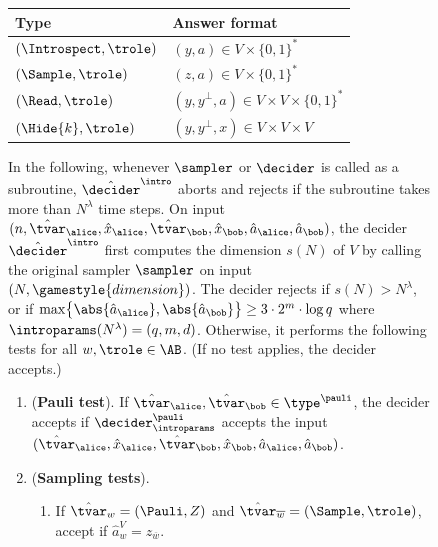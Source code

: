 \begin{figure}[!htbp]
  \begin{gamespec}
    \begin{table}[H]
      \centering
      \small
      \begin{tabularx}{.7\textwidth}{l X}
        \toprule
        Type \hspace{6em} & Answer format\\
        \midrule
        $(\Introspect, \trole)$ & $(y,a) \in V \times \{0,1\}^*$ \\
        $(\Sample, \trole)$ &  $(z,a) \in V \times \{0,1\}^*$ \\
        $(\Read, \trole)$ & $(y,y^{\perp},a) \in V \times V \times \{0,1\}^*$\\
        $(\Hide{k}, \trole)$ & $(y,y^{\perp},x) \in V \times V \times V$\\
        \bottomrule
      \end{tabularx}
    \end{table}
    In the following, whenever $\sampler$ or $\decider$ is called as a subroutine,
    $\tdint$ aborts and rejects if the subroutine takes more than
    $N^\lambda$ time steps.
    On input $(n, \hat{\tvar}_\alice, \hat{x}_\alice, \hat{\tvar}_\bob,
    \hat{x}_\bob, \hat{a}_\alice, \hat{a}_\bob)$, the decider $\tdint$
    first computes the dimension $s(N)$ of $V$ by calling the original sampler
    $\sampler$ on input $(N,\gamestyle{dimension})$.
    The decider rejects if $s(N) > N^\lambda$, or if  $\max \bigl\{ \abs{\hat{a}_\alice},
    \abs{\hat{a}_\bob} \bigr\} \geq 3 \cdot 2^m \cdot \log q$ where $\introparams(N^\lambda) = (q,m,d)$. Otherwise, it performs the following tests for all $w,\trole \in \AB$.
    (If no test applies, the decider accepts.) 
    

\begin{enumerate}[itemsep=2pt, parsep=2pt]
    \item (\textbf{Pauli test}).
      \label{enu:pauli}
      If $\hat{\tvar}_\alice, \hat{\tvar}_\bob \in \type^\pauli$, the decider
      accepts if $\decider^\pauli_\introparams$ accepts the input
      $(\hat{\tvar}_\alice, \hat{x}_\alice, \hat{\tvar}_\bob, \hat{x}_\bob,
      \hat{a}_\alice, \hat{a}_\bob)$.
    \item (\textbf{Sampling tests}).
      \label{enu:sampling}
      \begin{enumerate}
      \item If $\hat{\tvar}_w = (\Pauli,Z)$ and $\hat{\tvar}_{\overline{w}} =
        (\Sample, \trole)$, accept if $\hat{a}_w^V = z_{\overline{w}}$.
        \label{enu:sampling-pauli}


\end{enumerate}
\end{enumerate}
\end{gamespec}
\end{figure}
